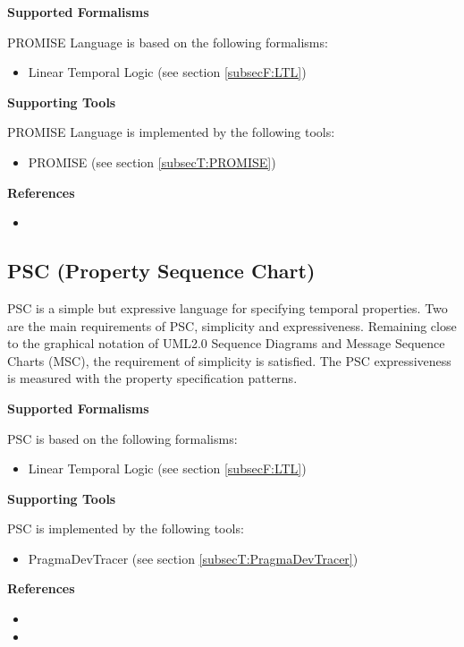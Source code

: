 \textbf{Supported Formalisms}

PROMISE Language is based on the following formalisms:
\begin{itemize}
	\item Linear Temporal Logic (see section \ref{subsecF:LTL})
\end{itemize}


\textbf{Supporting Tools}

PROMISE Language is implemented by the following tools:
\begin{itemize}
	\item PROMISE (see section \ref{subsecT:PROMISE})
\end{itemize}


\textbf{References}
\begin{itemize}
	
\item {}
\end{itemize}



\subsection{PSC (Property Sequence Chart)}
\label{subsecL:PSC}


PSC is a simple but expressive language for specifying temporal properties. Two are the main requirements of PSC, simplicity and expressiveness. Remaining close to the graphical notation of UML2.0 Sequence Diagrams and Message Sequence Charts (MSC), the requirement of simplicity is satisfied. The PSC expressiveness is measured with the property specification patterns.

\textbf{Supported Formalisms}

PSC is based on the following formalisms:
\begin{itemize}
	\item Linear Temporal Logic (see section \ref{subsecF:LTL})
\end{itemize}


\textbf{Supporting Tools}

PSC is implemented by the following tools:
\begin{itemize}
	\item PragmaDevTracer (see section \ref{subsecT:PragmaDevTracer})
\end{itemize}


\textbf{References}
\begin{itemize}
	
\item {}
	
\item {}
\end{itemize}



